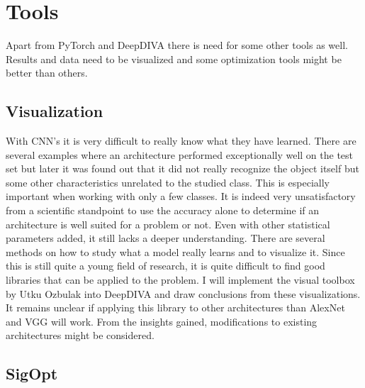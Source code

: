 \section{Tools}

Apart from PyTorch and DeepDIVA there is need for some other tools as well. Results and data need to be visualized and some optimization tools might be better than others.

\subsection{Visualization}

With CNN's it is very difficult to really know what they have learned. There are several examples where an architecture performed exceptionally well on the test set but later it was found out that it did not really recognize the object itself but some other characteristics unrelated to the studied class. This is especially important when working with only a few classes. It is indeed very unsatisfactory from a scientific standpoint to use the accuracy alone to determine if an architecture is well suited for a problem or not. Even with other statistical parameters added, it still lacks a deeper understanding. There are several methods on how to study what a model really learns and to visualize it. Since this is still quite a young field of research, it is quite difficult to find good libraries that can be applied to the problem. I will implement the visual toolbox by Utku Ozbulak \cite{viztoolbox} into DeepDIVA and draw conclusions from these visualizations. It remains unclear if applying this library to other architectures than AlexNet and VGG will work. From the insights gained, modifications to existing architectures might be considered. 

\subsection{SigOpt}

